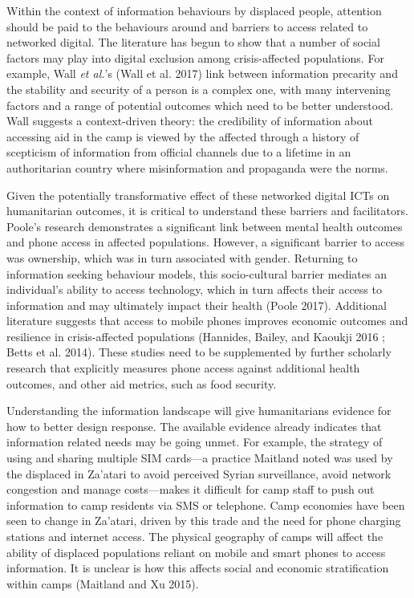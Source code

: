 Within the context of information behaviours by displaced people,
attention should be paid to the behaviours around and barriers to access
related to networked digital. The literature has begun to show that a
number of social factors may play into digital exclusion among
crisis-affected populations. For example, Wall \emph{et al.}'s (Wall et
al. 2017) link between information precarity and the stability and
security of a person is a complex one, with many intervening factors and
a range of potential outcomes which need to be better understood. Wall
suggests a context-driven theory: the credibility of information about
accessing aid in the camp is viewed by the affected through a history of
scepticism of information from official channels due to a lifetime in an
authoritarian country where misinformation and propaganda were the
norms.

Given the potentially transformative effect of these networked digital
ICTs on humanitarian outcomes, it is critical to understand these
barriers and facilitators. Poole's research demonstrates a significant
link between mental health outcomes and phone access in affected
populations. However, a significant barrier to access was ownership,
which was in turn associated with gender. Returning to information
seeking behaviour models, this socio-cultural barrier mediates an
individual's ability to access technology, which in turn affects their
access to information and may ultimately impact their health (Poole
2017). Additional literature suggests that access to mobile phones
improves economic outcomes and resilience in crisis-affected populations
(Hannides, Bailey, and Kaoukji 2016 ; Betts et al. 2014). These studies
need to be supplemented by further scholarly research that explicitly
measures phone access against additional health outcomes, and other aid
metrics, such as food security.

Understanding the information landscape will give humanitarians evidence
for how to better design response. The available evidence already
indicates that information related needs may be going unmet. For
example, the strategy of using and sharing multiple SIM cards---a
practice Maitland noted was used by the displaced in Za'atari to avoid
perceived Syrian surveillance, avoid network congestion and manage
costs---makes it difficult for camp staff to push out information to
camp residents via SMS or telephone. Camp economies have been seen to
change in Za'atari, driven by this trade and the need for phone charging
stations and internet access. The physical geography of camps will
affect the ability of displaced populations reliant on mobile and smart
phones to access information. It is unclear is how this affects social
and economic stratification within camps (Maitland and Xu 2015).

